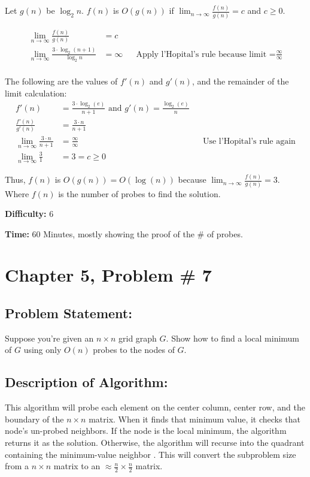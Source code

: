 \documentclass{article}
\begin{document}
Let $g(n)$ be $\log_2{n}$.  $f(n)$ is $O(g(n))$ if $\lim_{n\to\infty} \frac{ f(n)}{g(n)} = c$ and $c \geq 0$.

\begin{align*}
\lim_{n\to\infty} \frac{ f(n)}{g(n)} &= c \\
\lim_{n\to\infty} \frac{ 3 \cdot \log_2{(n + 1)} }{\log_2{n}} 
	&= \infty  && \text{Apply l'Hopital's rule because limit =} \frac{\infty}{\infty} \\
\end{align*}

\noindent The following are the values of $f'(n)$ and $g'(n)$, and the remainder of the limit calculation:
\begin{align*}
f'(n) &= \frac{3 \cdot \log_2(e)}{n + 1} \text{ and } g'(n) = \frac{\log_2(e)}{n} \\
\frac{ f'(n)}{g'(n)} &= \frac{3 \cdot n}{n + 1} \\
\lim_{n\to\infty} \frac{ 3 \cdot n}{n + 1} &= \frac{ \infty}{ \infty }  && \text{Use l'Hopital's rule again} \\
\lim_{n \to \infty} \frac{ 3 } {1} &= 3 = c \geq 0 
\end{align*}

\noindent Thus, $f(n)$ is $O(g(n)) = O( \log(n))$ because $\lim_{n \to \infty} \frac{f(n)}{g(n)} = 3$.  Where $f(n)$ is the number of probes to find the solution. 

\noindent \textbf{Difficulty:}  6

\noindent \textbf{Time:}  60 Minutes, mostly showing the proof of the \# of probes.

\newpage
\section*{Chapter 5, Problem \# 7}
\subsection*{Problem Statement:}
Suppose you're given an $n \times n$ grid graph $G$.
Show how to find a local minimum of $G$ using only $O(n)$ probes to the nodes of $G$.

\subsection*{Description of Algorithm:}
This algorithm will probe each element on the center column, center row, and the boundary of the $n \times n$ matrix.  
When it finds that minimum value, it checks that node's un-probed neighbors.  If the node is the local minimum, the algorithm returns it as the solution.  Otherwise, the algorithm will recurse into the quadrant containing the minimum-value neighbor \cite{MIT}.  This will convert the subproblem size from a $n \times n$ matrix to an $\approx \frac{n}{2} \times \frac{n}{2}$ matrix.  
\end{document}
